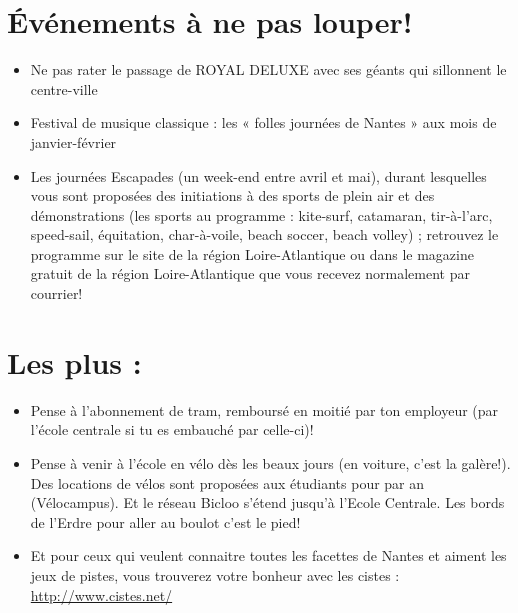 \section{Événements à ne pas louper!}\trad
\begin{itemize}
  \item Ne pas rater le passage de ROYAL DELUXE avec ses géants qui sillonnent le centre-ville
  \item Festival de musique classique : les « folles journées de Nantes » aux mois de janvier-février
  \item Les journées Escapades (un week-end entre avril et mai), durant lesquelles vous sont proposées des initiations à des sports de plein air et des démonstrations (les sports au programme : kite-surf, catamaran, tir-à-l'arc, speed-sail, équitation, char-à-voile, beach soccer, beach volley) ; retrouvez le programme sur le site de la région Loire-Atlantique ou dans le magazine gratuit de la région Loire-Atlantique que vous recevez normalement par courrier!
\end{itemize}

\section{Les plus :}\trad
\begin{itemize}
  \item Pense à l'abonnement de tram, remboursé en moitié par ton employeur (par l'école centrale si tu es embauché par celle-ci)!
  \item Pense à venir à l'école en vélo dès les beaux jours (en voiture, c'est la galère!).
Des locations de vélos sont proposées aux étudiants pour  par an (Vélocampus).
Et le réseau Bicloo s'étend jusqu'à l'Ecole Centrale.
Les bords de l'Erdre pour aller au boulot c'est le pied!
  \item Et pour ceux qui veulent connaitre toutes les facettes de Nantes et aiment les jeux de pistes, vous trouverez votre bonheur avec les cistes : \url{http://www.cistes.net/}
\end{itemize}



